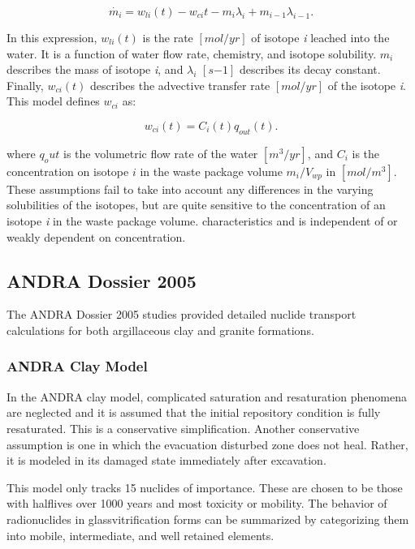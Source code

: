 {\begin{equation}
\dot{m_i}=w_{li}(t)-w_{ci}{t}-m_i\lambda_i+m_{i-1}\lambda_{i-1}.\nonumber
\end{equation}

In this expression, $w_{li}(t)$ is the rate $[mol/yr]$ of isotope \emph{i}
leached into the water.  It is a function of water flow rate, chemistry, and
isotope solubility. $m_i$ describes the mass of isotope \emph{i}, and
$\lambda_i$ $[s{-1}]$ describes its decay constant. Finally, $w_{ci}(t)$
describes the advective transfer rate $[mol/yr]$ of the isotope \emph{i}. This 
model defines $w_{ci}$ as:

\begin{equation}
  w_{ci}(t)=C_i(t)q_{out}(t). 
\end{equation}

where $q_out$ is the volumetric flow rate of the water $[m^3/yr]$, and 
$C_i$ is the concentration on isotope $i$ in the waste package volume 
$m_i/V_{wp}$ in $[mol/m^3]$. These assumptions fail to take into account any
differences in the varying solubilities of the isotopes, but are quite
sensitive to the concentration of an isotope \emph{i} in the waste package
volume.  
characteristics and is independent of or weakly dependent on concentration. 
\cite{li_methodology_2006}

\subsection{ANDRA Dossier 2005} The ANDRA Dossier 2005 studies provided
detailed nuclide transport calculations for both argillaceous clay and granite
formations. 

\subsubsection{ANDRA Clay Model} 

In the \gls{ANDRA} clay model, complicated saturation and resaturation phenomena 
are neglected and it is assumed that the initial repository condition is fully
resaturated. This is a conservative simplification. Another conservative
assumption is one in which the evacuation disturbed zone does not heal. Rather,
it is modeled in its damaged state immediately after excavation. 

This model only tracks 15 nuclides of importance.  These are chosen to be those
with halflives over 1000 years and most toxicity or mobility.
\cite{andra_argile:_2005} The behavior of radionuclides in 
glassvitrification forms can be summarized by categorizing them into mobile,
intermediate, and well retained elements. 

}
